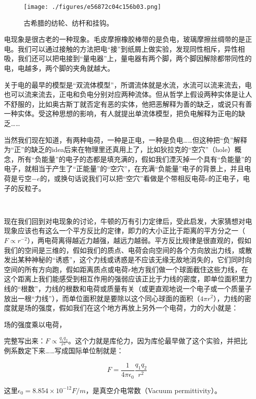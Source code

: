 \begin{figure}[ht]
\centering
\texttt{[image: ./figures/e56872c04c156b03.png]}
\caption{古希腊的纺轮、纺杆和挂钩。} \label{fig_QMPre2_9}
\end{figure}

电现象是很古老的一种现象。毛皮摩擦橡胶棒带的是负电，玻璃摩擦丝绸带的是正电。我们可以通过接触的方法把电“接”到纸屑上做实验，发现同性相斥，异性相吸，我们还可以把电接到“量电器”上，量电器有两个脚，两个脚因解除都带同性的电，电越多，两个脚的夹角就越大。

关于电的最早的模型是“双流体模型”，所谓流体就是水流，水流可以流来流去，电也可以流来流去，正电和负电分别对应两种流体。但从哲学上假设两种实体是让人不舒服的，比如奥古斯丁就否定有恶的实体，他把恶解释为善的缺乏，或说只有善一种实体。受这种思想的影响，有人就提出单流体模型，把负电解释为正电的缺乏……

当然我们现在知道，有两种电荷，一种是正电，一种是负电……但这种把“负”解释为“正”的缺乏的idea后来在物理里还真用上了，比如狄拉克的“空穴”（hole）概念，所有“负能量”的电子的态都是填充满的，假如我们湮灭掉一个具有“负能量”的电子，就相当于产生了“正能量”的“空穴”，在充满“负能量”电子的背景上，并且电荷是亏空$-e$的，或换句话说我们可以把“空穴”看做是个带相反电荷$e$的正电子，电子的反粒子。

~

现在我们回到对电现象的讨论，牛顿的万有引力定律后，受此启发，大家猜想对电现象应该也有这么一个平方反比的定律，即力的大小正比于距离的平方分之一（$F \propto r^{-2}$），两电荷离得越近力越强，越远力越弱。平方反比规律是很直观的，假如我们的空间是三维的，假如我们的质点、电荷会向空间的各个方向放出力线，或散发出某种神秘的“诱惑”，这个力线或诱惑是不应该无缘无故地消失的，它们同时向空间的所有方向跑，假如距离质点或电荷$r$地方我们做一个球面截住这些力线，在这个距离上我们能感受到相互作用的强弱应该正比于力线的密度，即单位面积里力线的“根数”，力线的根数和电荷或质量有关（或更直观地说一个电子或一个质量子放出一根“力线”），而单位面积就是要除以这个同心球面的面积（$4 \pi r^2$），力线的密度就是场的强度，假如我们在这个地方再放上另外一个电荷，力的大小就是：

场的强度乘以电荷，

完整写出来：$F \propto \frac{q_1 q_2}{r^2}$。这个力就是库伦力，因为库伦最早做了这个实验，并把比例系数定下来……写成国际单位制就是：

\begin{equation}
F = \frac{1}{4 \pi \epsilon_0 } \frac{q_1 q_2}{r^2}~
\end{equation}

这里$\epsilon_0 = 8.854 \times 10^{-12} F/m$，是真空介电常数（Vacuum permittivity）。

